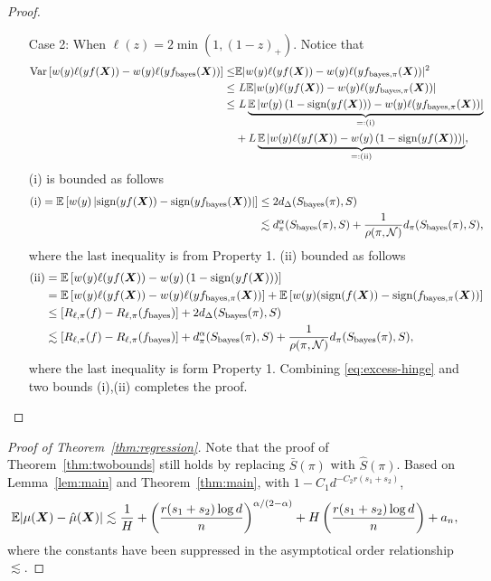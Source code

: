 \documentclass[11pt]{article}
\newcommand*{\KeepStyleUnderBrace}[1]{%
\mathop{%
\mathchoice
{\underbrace{\displaystyle#1}}%
{\underbrace{\textstyle#1}}%
{\underbrace{\scriptstyle#1}}%
{\underbrace{\scriptscriptstyle#1}}%
}\limits
}
\theoremstyle{plain}
\theoremstyle{definition}
\def\sign{\textup{sign}}
\def\bayesf{f_{\textup{bayes}}}
\def\bayesS{S_{\textup{bayes}}}
\def\bayespif{f_{\textup{bayes},\pi}}
\begin{document}
\begin{proof}
\begin{enumerate}[label={2.\arabic*},wide, labelwidth=!, labelindent=0pt]
\item[Case 2:] When $\ell(z) = 2\min(1,(1-z)_+)$.
Notice that 
\begin{align}
\text{Var}\left[w(y)\ell(yf(\mX))-w(y)\ell(y\bayesf(\mX))\right]
\leq & \mathbb{E}|w(y)\ell(yf(\mX))-w(y)\ell(y\bayespif(\mX))|^2\\
\leq& \ L\mathbb{E}|w(y)\ell(yf(\mX))-w(y)\ell(y\bayespif(\mX))|\\
\leq &\ L\KeepStyleUnderBrace{\mathbb{E}\left| w(y)\left(1-\sign(yf(\mX))\right)- w(y)\ell(y\bayespif(\mX))\right
|}_{=:\text{(i)}}\\&+L\KeepStyleUnderBrace{\mathbb{E}\left| w(y)\ell(yf(\mX))- w(y)\left(1-\sign(yf(\mX))\right) \right|}_{=:\text{(ii)}},
\end{align}
(i) is bounded as follows
\begin{align}
\text{(i)}=\mathbb{E}\left[w(y)\left|\sign (yf(\mX))-\sign (y\bayesf(\mX))\right|\right]&\leq 2d_\Delta(\bayesS(\pi),S)\\&\lesssim  d^\alpha_{\pi}(\bayesS(\pi),S)+{1\over \rho(\pi, \tN)}d_{\pi}(\bayesS(\pi),S),
\end{align}
where the last inequality is from Property 1.
(ii) bounded as follows
\begin{align}
    \text{(ii)}
    &=\mathbb{E}\left [w(y)\ell(yf(\mX))- w(y)\left(1-\sign(yf(\mX))\right) \right]\\
    &= \mathbb{E}\left[w(y)\ell(yf(\mX))-w(y)\ell(y\bayespif(\mX))\right]+ \mathbb{E}\left[w(y)(\sign(f(\mX))-\sign(\bayespif(\mX))\right]\\&\leq [R_{\ell,\pi}(f)-R_{\ell,\pi}(\bayesf)]+2d_\Delta(\bayesS(\pi),S)\\&\lesssim  [R_{\ell,\pi}(f)-R_{\ell,\pi}(\bayesf)]+ d^\alpha_{\pi}(\bayesS(\pi),S)+{1\over \rho(\pi, \tN)}d_{\pi}(\bayesS(\pi),S),
\end{align}
where the last inequality is form Property 1.
Combining \eqref{eq:excess-hinge} and two bounds (i),(ii) completes the proof.
\end{enumerate}
\end{proof}

\begin{proof}[Proof of Theorem~\ref{thm:regression}]
Note that the proof of Theorem~\ref{thm:twobounds} still holds by replacing $\bar S(\pi)$ with $\hat S(\pi)$. Based on Lemma~\ref{lem:main} and Theorem~\ref{thm:main}, with $1-C_1d^{-C_2r(s_1+s_2)}$, 
\begin{align}\label{eq:levelreg}
\mathbb{E}|\mu(\bm X)-\hat \mu(\bm X)|\lesssim {1\over H}+\left({r(s_1+s_2)\log d \over n}\right)^{\alpha/(2-\alpha)}+H\left({r(s_1+s_2)\log d \over n}\right)+a_n,
\end{align}
where the constants have been suppressed in the asymptotical order relationship $\lesssim$. 
\end{proof}
\end{document}
